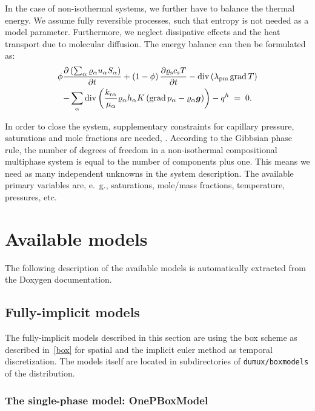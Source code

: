 In the case of non-isothermal systems, we further have to balance the
thermal energy. We assume fully reversible processes, such that entropy
is not needed as a model parameter. Furthermore, we neglect 
dissipative effects and the heat transport due to molecular
diffusion. The energy balance can then be
formulated as:
%
\begin{multline}
  \label{A3:eqenergmak1}
  \phi \frac{\partial \left( \sum_\alpha \varrho_{\alpha}
      u_\alpha S_\alpha \right)}{\partial t} + \left( 1 -
    \phi \right) \frac{\partial \varrho_{\text{s}} c_{\text{s}}
    T}{\partial t}  
 - \operatorname{div} \left( \lambda_{\text{pm}} \operatorname{grad} T \right)
   \\
   - \sum\limits_\alpha \operatorname{div} \left( \frac{k_{\text{r}
        \alpha}}{\mu_\alpha} \varrho_{\alpha} h_\alpha
    K \left( \operatorname{grad} p_\alpha - \varrho_{\alpha}
      \boldsymbol{g} \right) \right)  
 - q^h \; = \; 0.
\end{multline}

In order to close the system, supplementary constraints for capillary pressure, saturations and mole
fractions are needed, \cite{A3:helmig:1997}. 
According to the Gibbsian phase rule, the number of degrees of freedom
in a non-isothermal compositional multiphase system is equal to the
number of components plus one. This means we need as many independent
unknowns in the system description. The
available primary variables are, e.\ g., saturations, mole/mass
fractions, temperature, pressures, etc.




\section{Available models} 
The following description of the available models is automatically extracted 
from the Doxygen documentation.

\subsection{Fully-implicit models} 

The fully-implicit models described in this section are using the box
scheme as described in~\ref{box} for spatial and the implicit euler
method as temporal discretization. The models itself are located in
subdirectories of \texttt{dumux/boxmodels} of the \Dumux distribution.

\subsubsection{The single-phase model: OnePBoxModel} 


